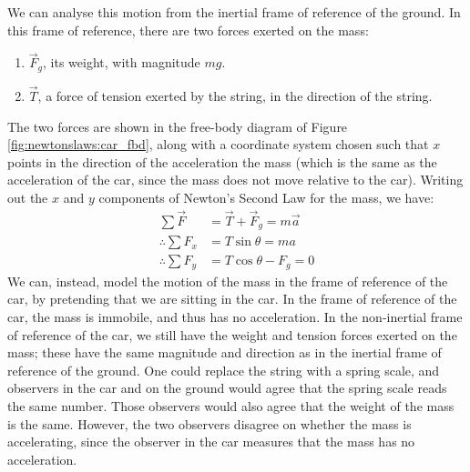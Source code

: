 We can analyse this motion from the inertial frame of reference of the ground. In this frame of reference, there are two forces exerted on the mass:
\begin{enumerate}
\item $\vec F_g$, its weight, with magnitude $mg$.
\item $\vec T$, a force of tension exerted by the string, in the direction of the string.
\end{enumerate}
The two forces are shown in the free-body diagram of Figure \ref{fig:newtonslaws:car_fbd}, along with a coordinate system chosen such that $x$ points in the direction of the acceleration the mass (which is the same as the acceleration of the car, since the mass does not move relative to the car). 
Writing out the $x$ and $y$ components of Newton's Second Law for the mass, we have:
\begin{align*}
\sum \vec F &= \vec T + \vec F_g= m \vec a\\
\therefore\sum F_x &= T\sin\theta = ma\\
\therefore\sum F_y &= T\cos\theta-F_g=0
\end{align*}
We can, instead, model the motion of the mass in the frame of reference of the car, by pretending that we are sitting in the car. In the frame of reference of the car, the mass is immobile, and thus has no acceleration. In the non-inertial frame of reference of the car, we still have the weight and tension forces exerted on the mass; these have the same magnitude and direction as in the inertial frame of reference of the ground. One could replace the string with a spring scale, and observers in the car and on the ground would agree that the spring scale reads the same number. Those observers would also agree that the weight of the mass is the same. However, the two observers disagree on whether the mass is accelerating, since the observer in the car measures that the mass has no acceleration.


